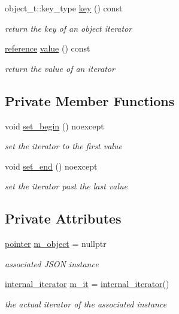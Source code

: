 \begin{DoxyCompactItemize}
object\+\_\+t\+::key\+\_\+type \hyperlink{classnlohmann_1_1basic__json_1_1iter__impl_a24fb00bcfcbb0cca70dfff619deed7fa}{key} () const 
\begin{DoxyCompactList}\small\item\em return the key of an object iterator \end{DoxyCompactList}\item 
\hyperlink{classnlohmann_1_1basic__json_1_1iter__impl_a0e391c9035a242461d131b2dc0314256}{reference} \hyperlink{classnlohmann_1_1basic__json_1_1iter__impl_a87177104a65f86ea6d324f334f0cca4e}{value} () const 
\begin{DoxyCompactList}\small\item\em return the value of an iterator \end{DoxyCompactList}\end{DoxyCompactItemize}
\subsection*{Private Member Functions}
\begin{DoxyCompactItemize}
\item 
void \hyperlink{classnlohmann_1_1basic__json_1_1iter__impl_a7b31e07f6f567cb8779f7f847bae8b12}{set\+\_\+begin} () noexcept
\begin{DoxyCompactList}\small\item\em set the iterator to the first value \end{DoxyCompactList}\item 
void \hyperlink{classnlohmann_1_1basic__json_1_1iter__impl_ac10ca7068b11801ebfd1032f8821f324}{set\+\_\+end} () noexcept
\begin{DoxyCompactList}\small\item\em set the iterator past the last value \end{DoxyCompactList}\end{DoxyCompactItemize}
\subsection*{Private Attributes}
\begin{DoxyCompactItemize}
\item 
\hyperlink{classnlohmann_1_1basic__json_1_1iter__impl_a3b56ff21ecdde2dc147288ee64cff0fd}{pointer} \hyperlink{classnlohmann_1_1basic__json_1_1iter__impl_a1c6303265483322388cbd033ddf53f72}{m\+\_\+object} = nullptr
\begin{DoxyCompactList}\small\item\em associated J\+S\+O\+N instance \end{DoxyCompactList}\item 
\hyperlink{structnlohmann_1_1basic__json_1_1internal__iterator}{internal\+\_\+iterator} \hyperlink{classnlohmann_1_1basic__json_1_1iter__impl_a22ffccd0f8f74669076118c3c374a29c}{m\+\_\+it} = \hyperlink{structnlohmann_1_1basic__json_1_1internal__iterator}{internal\+\_\+iterator}()
\begin{DoxyCompactList}\small\item\em the actual iterator of the associated instance \end{DoxyCompactList}\end{DoxyCompactItemize}

